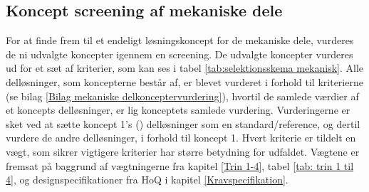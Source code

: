 \subsection{Koncept screening af mekaniske dele} \label{Mekanisk system - vurdering}
For at finde frem til et endeligt løsningskoncept for de mekaniske dele, vurderes de ni udvalgte koncepter igennem en screening. De udvalgte koncepter vurderes ud for et sæt af kriterier, som kan ses i tabel \ref{tab:selektionsskema mekanisk}. Alle delløsninger, som koncepterne består af, er blevet vurderet i forhold til kriterierne (se bilag \ref{Bilag mekaniske delkonceptervurdering}), hvortil de samlede værdier af et koncepts delløsninger, er lig konceptets samlede vurdering. Vurderingerne er sket ved at sætte koncept 1's (\lillacirc) delløsninger som en standard/reference, og dertil vurdere de andre delløsninger, i forhold til koncept 1. Hvert kriterie er tildelt en vægt, som sikrer vigtigere kriterier har større betydning for udfaldet. Vægtene er fremsat på baggrund af vægtningerne fra kapitel \ref{Trin 1-4}, tabel \ref{tab: trin 1 til 4}, og designspecifikationer fra HoQ i kapitel \ref{Kravspecifikation}.


